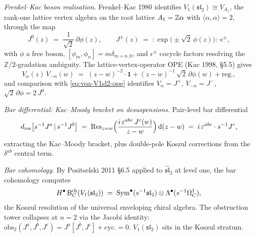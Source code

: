 \emph{Frenkel--Kac boson realisation.} Frenkel--Kac 1980 identifies
$V_1(\mathfrak{sl}_2) \cong V_{A_1}$, the rank-one lattice vertex
algebra on the root lattice $A_1 = \Zbb\alpha$ with $\langle\alpha,\alpha\rangle = 2$,
through the map
\begin{equation}
\label{eq:voa-FK-realisation}
  J^0(z) \;=\; \frac{1}{\sqrt{2}}\,\partial\phi(z), \qquad
  J^{\pm}(z) \;=\; {:}\exp\bigl(\pm\sqrt{2}\,\phi(z)\bigr){:} \cdot \epsilon^\pm,
\end{equation}
with $\phi$ a free boson, $[\phi_m, \phi_n] = m\delta_{m+n,0}$, and
$\epsilon^\pm$ cocycle factors resolving the $\mathbb Z/2$-gradation
ambiguity. The lattice-vertex-operator OPE (Kac 1998, \S5.5) gives
\begin{equation}
\label{eq:voa-FK-ope-check}
  V_\alpha(z)\,V_{-\alpha}(w) \;=\; (z-w)^{-2}\cdot\mathbf{1} + (z-w)^{-1}\,\sqrt{2}\,\partial\phi(w) + \mathrm{reg.},
\end{equation}
and comparison with \eqref{eq:voa-V1sl2-ope} identifies
$V_\alpha = J^+$, $V_{-\alpha} = J^-$, $\sqrt{2}\,\partial\phi = 2\,J^0$.

\emph{Bar differential: Kac--Moody bracket on desuspensions.}
Pair-level bar differential
\begin{equation}
\label{eq:voa-V1sl2-bar-diff}
  d_{\mathrm{res}}\bigl[s^{-1}J^a\,|\,s^{-1}J^b\bigr]
  \;=\; \mathrm{Res}_{z = w}\Bigl(\frac{i\,\varepsilon^{abc}\,J^c(w)}{z - w}\Bigr)\,
  \mathrm{d}(z - w) \;=\; i\,\varepsilon^{abc}\cdot s^{-1}J^c,
\end{equation}
extracting the Kac--Moody bracket, plus double-pole Koszul
corrections from the $\delta^{ab}$ central term.

\emph{Bar cohomology.} By Positselski 2011 \S6.5 applied to
$\hat{\mathfrak{sl}}_2$ at level one, the bar cohomology computes
\begin{equation}
\label{eq:voa-V1sl2-bar-cohomology}
  H^\bullet\,\Bar^{\mathrm{ch}}_C(V_1(\mathfrak{sl}_2))
  \;=\; \mathrm{Sym}^\bullet(s^{-1}\mathfrak{sl}_2)\otimes\Lambda^\bullet(s^{-1}\Omega^1_C),
\end{equation}
the Koszul resolution of the universal enveloping chiral algebra.
The obstruction tower collapses at $n = 2$ via the Jacobi identity:
$\mathrm{obs}_2(J^a, J^b, J^c) = J^a[J^b, J^c] + \text{cyc.} = 0$.
$V_1(\mathfrak{sl}_2)$ sits in the Koszul stratum.

